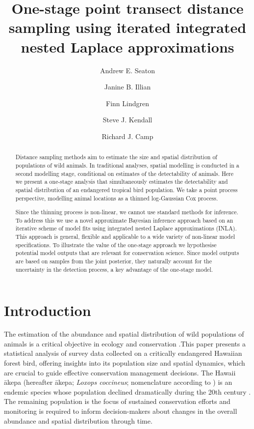 \documentclass{statsoc}
\title[One-stage point transect distance sampling using iterated INLA]{One-stage point transect distance sampling using iterated integrated nested Laplace approximations}
\author[Andrew E. Seaton {\it et al.}]{Andrew E. Seaton}
\author{Janine B. Illian}
\author{Finn Lindgren}
\author{Steve J. Kendall}
\author{Richard J. Camp}
\newcommand{\akepa}{\textquotesingle\={a}kepa}  %
\newcommand{\hawaii}{Hawai\textquotesingle i}   %
\begin{document}
\begin{abstract}
Distance sampling methods aim to estimate the size and spatial distribution of populations of wild animals.  In traditional analyses, spatial modelling is conducted in a second modelling stage, conditional on estimates of the detectability of animals. Here we present a one-stage analysis that simultaneously estimates the detectability and spatial distribution of an endangered tropical bird population.  We take a point process perspective, modelling animal locations as a thinned log-Gaussian Cox process.

Since the thinning process is non-linear, we cannot use standard methods for inference. To address this we use a novel approximate Bayesian inference approach based on an iterative scheme of model fits using integrated nested Laplace approximations (INLA).  This approach is general, flexible and applicable to a wide variety of non-linear model specifications. To illustrate the value of the one-stage approach we hypothesise potential model outputs that are relevant for conservation science.  Since model outputs are based on samples from the joint posterior, they naturally account for the uncertainty in the detection process, a key advantage of the one-stage model. 

\end{abstract}


\section{Introduction}

The estimation of the abundance and spatial distribution of wild populations of animals is a critical objective in ecology and conservation \citep{schwarz_estimating_1999}.This paper presents a statistical analysis of survey data collected on a critically endangered Hawaiian forest bird, offering insights into its population size and spatial dynamics, which are crucial to guide effective conservation management decisions.  The \hawaii{} \akepa{} (hereafter \akepa{}; \textit{Loxops coccineus}; nomenclature according to \citealp{usfws_akepa_1970}) is an endemic species whose population declined dramatically during the 20th century  \citep{usfws_revised_2006, judge_akepa_2018}.  The remaining population is the focus of sustained conservation efforts and monitoring is required to inform decision-makers about changes in the overall abundance and spatial distribution through time.  
\end{document}
